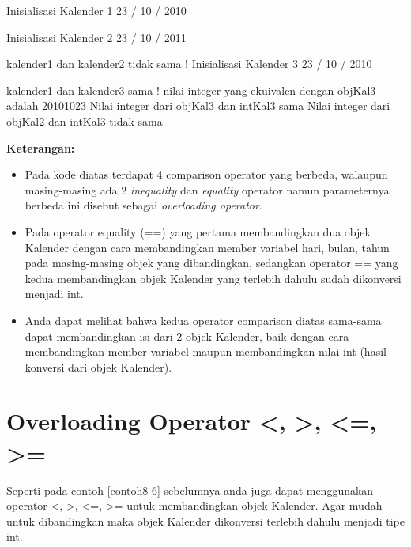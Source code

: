 \begin{lcverbatim}
Inisialisasi Kalender 1
23 / 10 / 2010

Inisialisasi Kalender 2
23 / 10 / 2011

kalender1 dan kalender2 tidak sama !
Inisialisasi Kalender 3
23 / 10 / 2010

kalender1 dan kalender3 sama !
nilai integer yang ekuivalen dengan objKal3 adalah 20101023
Nilai integer dari objKal3 dan intKal3 sama
Nilai integer dari objKal2 dan intKal3 tidak sama
\end{lcverbatim}

\textbf{Keterangan:}

\begin{itemize}

\item
  Pada kode diatas terdapat 4 comparison operator yang berbeda, walaupun
  masing-masing ada 2 \emph{inequality} dan \emph{equality} operator
  namun parameternya berbeda ini disebut sebagai \emph{overloading
  operator}.
\item
  Pada operator equality (==) yang pertama membandingkan dua objek
  Kalender dengan cara membandingkan member variabel hari, bulan, tahun
  pada masing-masing objek yang dibandingkan, sedangkan operator == yang
  kedua membandingkan objek Kalender yang terlebih dahulu sudah
  dikonversi menjadi int.
\item
  Anda dapat melihat bahwa kedua operator comparison diatas sama-sama
  dapat membandingkan isi dari 2 objek Kalender, baik dengan cara
  membandingkan member variabel maupun membandingkan nilai int (hasil
  konversi dari objek Kalender).
\end{itemize}

\section{Overloading Operator \textless{}, \textgreater{}, \textless{}=, \textgreater{}=}\label{overloading-operator}

Seperti pada contoh \ref{contoh8-6} sebelumnya anda juga dapat menggunakan operator
\textless{}, \textgreater{}, \textless{}=, \textgreater{}= untuk
membandingkan objek Kalender. Agar mudah untuk dibandingkan maka objek
Kalender dikonversi terlebih dahulu menjadi tipe int.

